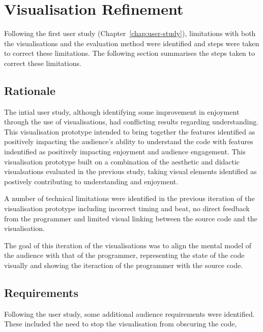 
\chapter{Visualisation Refinement}
\label{chap:visualisation-refinement}

Following the first user study (Chapter~\ref{chap:user-study}), limitations with both the visualisations and the evaluation method were identified and steps were taken to correct these limitations. The following section summarises the steps taken to correct these limitations.

\section{Rationale}

The intial user study, although identifying some improvement in enjoyment through the use of visualisations, had conflicting results regarding understanding. This visualisation prototype intended to bring together the features identified as positively impacting the audience's ability to understand the code with features indentified as positively impacting enjoyment and audience engagement. This visualisation prototype built on a combination of the aesthetic and didactic visualsations evaluated in the previous study, taking visual elements identified as postively contributing to understanding and enjoyment.

A number of technical limitations were identified in the previous iteration of the visualisation prototype including incorrect timing and beat, no direct feedback from the programmer and limited visual linking between the source code and the visualisation.

The goal of this iteration of the visualisations was to align the mental model of the audience with that of the programmer, representing the state of the code visually and showing the iteraction of the programmer with the source code.


\section{Requirements}

Following the user study, some additional audience requirements were identified. These included the need to stop the visualisation from obscuring the code, 

